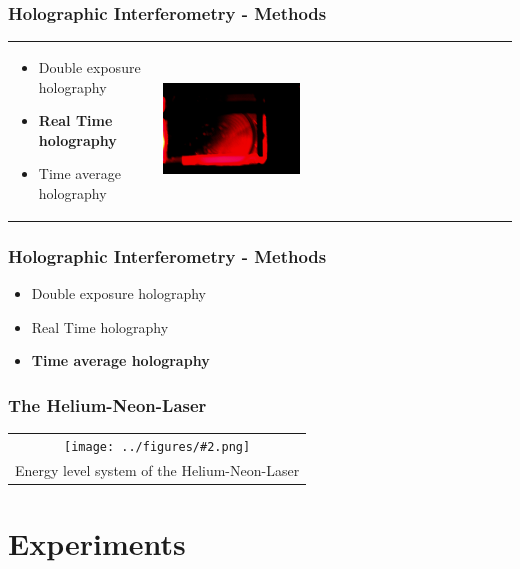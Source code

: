 \documentclass{beamer}
\newcommand{\gra}[3][]{
	\begin{table}
	\centering
	\begin{tabular}[width=\textwidth]{c}
		\texttt{[image: ../figures/\#2.png]}\\
		\small #3
	\end{tabular}
	\end{table}
}
\begin{document}
\begin{frame}
	\frametitle{Holographic Interferometry - Methods}
		\begin{table}
			\centering
			\begin{tabular}[width=\textwidth]{m{6cm}m{4cm}}
	\begin{itemize}
		\item Double exposure holography
		\item \textbf{Real Time holography}
		\item Time average holography
	\end{itemize}
				&
				\includegraphics[width=0.4\textwidth]{../figures/aluminium2_edit.png}
			\end{tabular}
		\end{table}

\end{frame}
\begin{frame}
	\frametitle{Holographic Interferometry - Methods}
	\begin{itemize}
		\item Double exposure holography
		\item Real Time holography
		\item \textbf{Time average holography}
	\end{itemize}
\end{frame}
\begin{frame}
	\frametitle{The Helium-Neon-Laser}
 \gra[0.5]{HeNe}{Energy level system of the Helium-Neon-Laser \footnotemark}
\end{frame}
\section{Experiments}
\frame{\tableofcontents[currentsection]}
\end{document}
